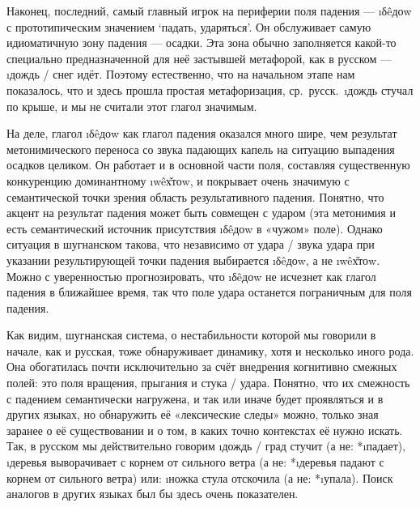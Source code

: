 Наконец, последний, самый главный игрок на периферии поля падения — \i{δêдоw} с прототипическим значением ‘падать, ударяться’. Он обслуживает самую идиоматичную зону падения — осадки. Эта зона обычно заполняется какой-то специально предназначенной для неё застывшей метафорой, как в русском — \i{дождь / снег идёт}. Поэтому естественно, что на начальном этапе нам показалось, что и здесь прошла простая метафоризация, ср.~русск.~\i{дождь стучал по крыше}, и мы не считали этот глагол значимым.

На деле, глагол \i{δêдоw} как глагол падения оказался много шире, чем результат метонимического переноса со звука падающих капель на ситуацию выпадения осадков целиком. Он работает и в основной части поля, составляя существенную конкуренцию доминантному \i{wêх̌тоw}, и покрывает очень значимую с семантической точки зрения область результативного падения. Понятно, что акцент на результат падения может быть совмещен с ударом (эта метонимия и есть семантический источник присутствия \i{δêдоw} в «чужом» поле). Однако ситуация в шугнанском такова, что независимо от удара / звука удара при указании результирующей точки падения выбирается \i{δêдоw}, а не \i{wêх̌тоw}. Можно с уверенностью прогнозировать, что \i{δêдоw} не исчезнет как глагол падения в ближайшее время, так что поле удара останется пограничным для поля падения.

Как видим, шугнанская система, о нестабильности которой мы говорили в начале, как и русская, тоже обнаруживает динамику, хотя и несколько иного рода. Она обогатилась почти исключительно за счёт внедрения когнитивно смежных полей: это поля вращения, прыгания и стука / удара. Понятно, что их смежность с падением семантически нагружена, и так или иначе будет проявляться и в других языках, но обнаружить её «лексические следы» можно, только зная заранее о её существовании и о том, в каких точно контекстах её нужно искать. Так, в русском мы действительно говорим \i{дождь / град стучит} (а не: *\i{падает}), \i{деревья выворачивает с корнем от сильного ветра} (а не: *\i{деревья падают с корнем от сильного ветра}) или: \i{ножка стула отскочила} (а не: *\i{упала}). Поиск аналогов в других языках был бы здесь очень показателен.